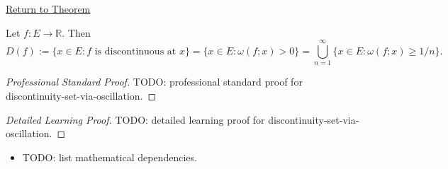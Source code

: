 \newpage
{}
\label{prf:discontinuity-set-via-oscillation}

\begin{remark*}[Return]
\hyperref[prop:discontinuity-set-via-oscillation]{Return to Theorem}
\end{remark*}

\begin{theorem*}
Let $f:E\to\mathbb{R}$. Then
\[
D(f):=\{x\in E: f \text{ is discontinuous at } x\}
=\{x\in E: \omega(f;x)>0\}
=\bigcup_{n=1}^{\infty} \{x\in E: \omega(f;x)\ge 1/n\}.
\]
\end{theorem*}

\begin{proof}[Professional Standard Proof]
\LRAProofBodyStart
TODO: professional standard proof for discontinuity-set-via-oscillation.
\end{proof}

\begin{proof}[Detailed Learning Proof]
\LRAProofBodyStart
TODO: detailed learning proof for discontinuity-set-via-oscillation.
\end{proof}

\begin{remark*}
\end{remark*}

\begin{dependencies}
\begin{itemize}
  \item TODO: list mathematical dependencies.
\end{itemize}
\end{dependencies}

\clearpage
